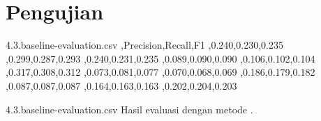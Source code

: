 \section{Pengujian}


\begin{filecontents*}{4.3.baseline-evaluation.csv}
  {},Precision,Recall,F1
  ,0.240,0.230,0.235
  ,0.299,0.287,0.293
  ,0.240,0.231,0.235
  ,0.089,0.090,0.090
  ,0.106,0.102,0.104
  ,0.317,0.308,0.312
  ,0.073,0.081,0.077
  ,0.070,0.068,0.069
  ,0.186,0.179,0.182
  ,0.087,0.087,0.087
  ,0.164,0.163,0.163
  ,0.202,0.204,0.203
\end{filecontents*}
  {4.3.baseline-evaluation.csv}
  {Hasil evaluasi  dengan metode .}
